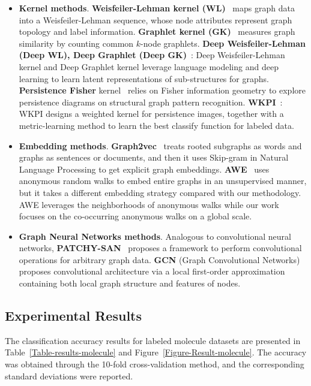 \documentclass[10pt,journal,compsoc]{IEEEtran}
\begin{document}
\begin{itemize}
    \item \textbf{Kernel methods}. \textbf{Weisfeiler-Lehman kernel (WL)}~\cite{WL-kernel} maps graph data into a Weisfeiler-Lehman sequence, whose node attributes represent graph topology and label information. \textbf{Graphlet kernel (GK)}~\cite{GK-graphlet-kernel} measures graph similarity by counting common $k$-node graphlets. \textbf{Deep Weisfeiler-Lehman (Deep WL), Deep Graphlet (Deep GK)}~\cite{Deep-graph-kernels}: Deep Weisfeiler-Lehman kernel and Deep Graphlet kernel leverage language modeling and deep learning to learn latent representations of sub-structures for graphs. \textbf{Persistence Fisher} kernel~\cite{Persistence-Fisher} relies on Fisher information geometry to explore persistence diagrams on structural graph pattern recognition. \textbf{WKPI}~\cite{WKPI}: WKPI designs a weighted kernel for persistence images, together with a metric-learning method to learn the best classify function for labeled data.
    \item \textbf{Embedding methods}. \textbf{Graph2vec}~\cite{graph2vec} treats rooted subgraphs as words and graphs as sentences or documents, and then it uses Skip-gram in Natural Language Processing to get explicit graph embeddings. \textbf{AWE}~\cite{AWE} uses anonymous random walks to embed entire graphs in an unsupervised manner, but it takes a different embedding strategy compared with our methodology. AWE leverages the neighborhoods of anonymous walks while our work focuses on the co-occurring anonymous walks on a global scale.
    \item \textbf{Graph Neural Networks methods}. Analogous to convolutional neural networks, \textbf{PATCHY-SAN}~\cite{PSCN} proposes a framework to perform convolutional operations for arbitrary graph data. \textbf{GCN} (Graph Convolutional Networks)~\cite{GCN} proposes convolutional architecture via a local first-order approximation containing both local graph structure and features of nodes.
\end{itemize}


\subsection{Experimental Results}
The classification accuracy results for labeled molecule datasets are presented in Table~\ref{Table-results-molecule} and Figure~\ref{Figure-Result-molecule}. The accuracy was obtained through the 10-fold cross-validation method, and the corresponding standard deviations were reported.
\end{document}
